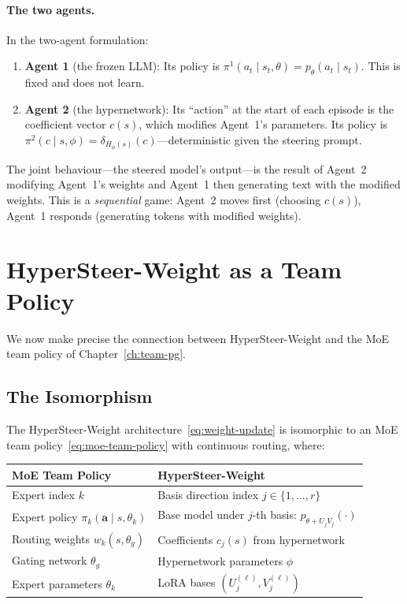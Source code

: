\paragraph{The two agents.} In the two-agent formulation:
\begin{enumerate}[label=(\roman*)]
  \item \textbf{Agent 1} (the frozen LLM): Its policy is $\pi^1(a_t \mid s_t, \theta) = p_\theta(a_t \mid s_t)$. This is fixed and does not learn.
  \item \textbf{Agent 2} (the hypernetwork): Its ``action'' at the start of each episode is the coefficient vector $c(s)$, which modifies Agent~1's parameters. Its policy is $\pi^2(c \mid s, \phi) = \delta_{H_\phi(s)}(c)$---deterministic given the steering prompt.
\end{enumerate}
The joint behaviour---the steered model's output---is the result of Agent~2 modifying Agent~1's weights and Agent~1 then generating text with the modified weights. This is a \emph{sequential} game: Agent~2 moves first (choosing $c(s)$), Agent~1 responds (generating tokens with modified weights).

\section{HyperSteer-Weight as a Team Policy}
\label{sec:hsw-as-team}

We now make precise the connection between HyperSteer-Weight and the MoE team policy of Chapter~\ref{ch:team-pg}.

\subsection{The Isomorphism}
\label{subsec:hsw-moe-iso}

\begin{proposition}\label{prop:hsw-moe}
The HyperSteer-Weight architecture~\eqref{eq:weight-update} is isomorphic to an MoE team policy~\eqref{eq:moe-team-policy} with continuous routing, where:
\begin{center}
\renewcommand{\arraystretch}{1.3}
\begin{tabular}{ll}
\textbf{MoE Team Policy} & \textbf{HyperSteer-Weight} \\
\hline
Expert index $k$ & Basis direction index $j\in\{1,\ldots,r\}$ \\
Expert policy $\pi_k(\bm{a}\mid s,\theta_k)$ & Base model under $j$-th basis: $p_{\theta + U_j V_j}(\cdot)$ \\
Routing weights $w_k(s,\theta_g)$ & Coefficients $c_j(s)$ from hypernetwork \\
Gating network $\theta_g$ & Hypernetwork parameters $\phi$ \\
Expert parameters $\theta_k$ & LoRA bases $(U^{(\ell)}_j, V^{(\ell)}_j)$ \\
\end{tabular}
\end{center}
\end{proposition}

